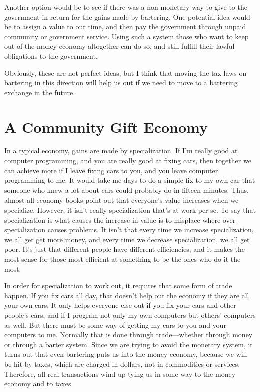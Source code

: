 \begin{policynote}
Another option would be to see if there was a non-monetary way to give to the government in return
for the gains made by bartering.  One potential idea would be to assign a value to our time, and 
then pay the government through unpaid community or government service.  Using such a system those
who want to keep out of the money economy altogether can do so, and still fulfill their lawful
obligations to the government.

Obviously, these are not perfect ideas, but I think that moving the tax laws on bartering in this
direction will help us out if we need to move to a bartering exchange in the future.
\end{policynote}

\section{A Community Gift Economy}

In a typical economy, gains are made by specialization. If I’m really
good at computer programming, and you are really good at fixing cars,
then together we can achieve more if I leave fixing cars to you, and
you leave computer programming to me. It would take me days to do a
simple fix to my own car that someone who knew a lot about cars could
probably do in fifteen minutes. Thus, almost all economy books point
out that everyone’s value increases when we specialize. However, it
isn’t really specialization that’s at work per se. To say that
specialization is what causes the increase in value is to misplace
where over-specialization causes problems. It isn’t that every time we
increase specialization,
we all get
get more money, and
every time we decrease specialization, we all get poor. It’s just that
different people have different efficiencies, and it makes the most
sense for those most efficient at something to be the ones who do it
the most.

In order for specialization to work out, it requires that some form of
trade happen. If you fix cars all day, that doesn’t help out the
economy if they are all your own cars. It only helps everyone else out
if you fix your cars and other people’s cars, and if I program not only
my own computers but others’ computers as well. But there must be some
way of getting my cars to you and your computers to me. Normally that
is done through trade—whether through money or through a barter system.
Since we are trying to avoid the monetary system, it turns out that
even bartering puts us into the money economy, because we will be hit
by taxes, which are charged in dollars, not in commodities or services.
Therefore, all real transactions wind up tying us in some way to the
money economy and to taxes.

